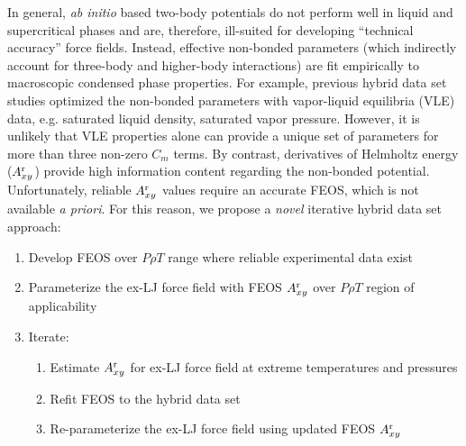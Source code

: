 \documentclass[12pt,a4paper]{article}
\begin{document}
In general, \textit{ab initio} based two-body potentials do not perform well in liquid and supercritical phases and are, therefore, ill-suited for developing ``technical accuracy'' force fields. Instead, effective non-bonded parameters (which indirectly account for three-body and higher-body interactions) are fit empirically to macroscopic condensed phase properties. For example, previous hybrid data set studies optimized the non-bonded parameters with vapor-liquid equilibria (VLE) data, e.g. saturated liquid density, saturated vapor pressure. However, it is unlikely that VLE properties alone can provide a unique set of parameters for more than three non-zero $C_m$ terms. By contrast, derivatives of Helmholtz energy ($A_{xy}^{\rm r}$) provide high information content regarding the non-bonded potential. Unfortunately, reliable $A_{xy}^{\rm r}$ values require an accurate FEOS, which is not available \textit{a priori}. For this reason, we propose a \textit{novel} iterative hybrid data set approach:


\begin{enumerate}%
	\item Develop FEOS over $P \rho T$ range where reliable experimental data exist
	\item Parameterize the ex-LJ force field with FEOS $A_{xy}^{\rm r}$ over $P \rho T$ region of applicability
	\item Iterate: 
	\begin{enumerate}[nolistsep]%
		\item Estimate $A_{xy}^{\rm r}$ for ex-LJ force field at extreme temperatures and pressures
		\item Refit FEOS to the hybrid data set
		\item Re-parameterize the ex-LJ force field using updated FEOS $A_{xy}^{\rm r}$
	\end{enumerate}
\end{enumerate}




\end{document}
